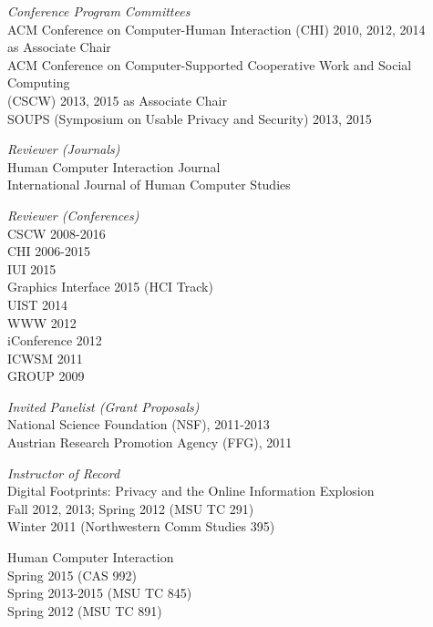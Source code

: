 \documentclass[9pt]{extarticle}
\makeatletter
\renewcommand{\section}{%
  \@startsection{section}{1}{0em}{\baselineskip}{3pt}{\large\bfseries\textsc}}
\makeatother
\begin{document}
\emph{Conference Program Committees} \\
ACM Conference on Computer-Human Interaction (CHI)  2010, 2012, 2014 \\
\hspace{0.5cm} as Associate Chair \\
ACM Conference on Computer-Supported Cooperative Work and Social Computing \\
\hspace{0.5cm} (CSCW) 2013, 2015 as Associate Chair \\
SOUPS (Symposium on Usable Privacy and Security) 2013, 2015

\emph{Reviewer (Journals)} \\
Human Computer Interaction Journal \\
International Journal of Human Computer Studies

\emph{Reviewer (Conferences)} \\
CSCW 2008-2016 \\
CHI 2006-2015 \\
IUI 2015 \\
Graphics Interface 2015 (HCI Track) \\
UIST 2014 \\
WWW 2012 \\
iConference 2012 \\
ICWSM 2011 \\
GROUP 2009

\emph{Invited Panelist (Grant Proposals)} \\
National Science Foundation (NSF), 2011-2013 \\
Austrian Research Promotion Agency (FFG), 2011


\section{Teaching}

\emph{Instructor of Record} \\
Digital Footprints: Privacy and the Online Information Explosion \\ 
\hspace{0.5cm} Fall 2012, 2013; Spring 2012 (MSU TC 291) \\
\hspace{0.5cm} Winter 2011 (Northwestern Comm Studies 395)

Human Computer Interaction \\
\hspace{0.5cm} Spring 2015 (CAS 992) \\
\hspace{0.5cm} Spring 2013-2015 (MSU TC 845) \\
\hspace{0.5cm} Spring 2012 (MSU TC 891)
\end{document}

